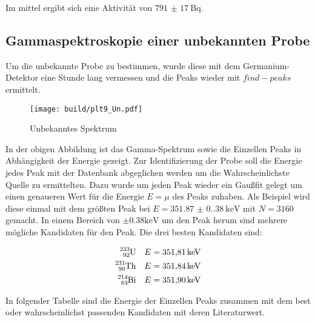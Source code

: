 Im mittel ergibt sich eine Aktivität von $\qty{791(17)}{\becquerel}$.

\subsection{Gammaspektroskopie einer unbekannten Probe}
Um die unbekannte Probe zu bestimmen, wurde diese mit dem Germanium-Detektor
eine Stunde lang vermessen und die Peaks wieder mit $find-peaks$ ermittelt.

\begin{figure}[H]
	\centering
	\texttt{[image: build/plt9\_Un.pdf]}
	\caption{Unbekanntes Spektrum}
	\label{fig:Un_spektrum}
\end{figure}

In der obigen Abbildung ist das Gamma-Spektrum sowie die Einzellen Peaks in
Abhängigkeit der Energie gezeigt. Zur Identifizierung der Probe soll die
Energie jedes Peak mit der Datenbank \cite{nuclear} abgeglichen werden um die
Wahrscheinlichste Quelle zu ermittelten. Dazu wurde um jeden Peak wieder ein
Gaußfit gelegt um einen genaueren Wert für die Energie $E=\mu$ des Peaks
zuhaben. Als Beispiel wird diese einmal mit dem größten Peak bei
$E=\qty{351.87(0.38)}{\kilo\eV}$ mit $N=3160$ gemacht. In einem Bereich von
$\pm 0.38\unit{\kilo\eV}$ um den Peak herum sind mehrere mögliche Kandidaten
für den Peak. Die drei besten Kandidaten sind:

\begin{align*}
	\ce{^{233}_{92}U}  &  & E=\qty{351.81}{\kilo\eV} \\
	\ce{^{231}_{90}Th} &  & E=\qty{351.84}{\kilo\eV} \\
	\ce{^{214}_{83}Bi} &  & E=\qty{351.90}{\kilo\eV} \\
\end{align*}

In folgender Tabelle sind die Energie der Einzellen Peaks zusammen mit dem best
oder wahrscheinlichst passenden Kandidaten mit deren Literaturwert.

